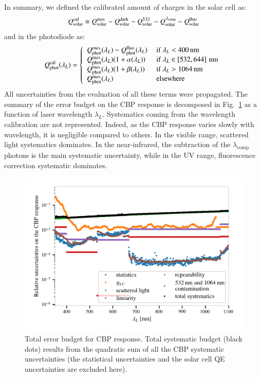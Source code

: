 In summary, we defined the calibrated amount of charges in the solar cell as:
\begin{equation}
Q_{\mathrm{solar}}^{\mathrm{cal}} \equiv Q_{\mathrm{solar}}^{\mathrm{mes}} - Q_{\mathrm{solar}}^{\rm dark} - Q_{\mathrm{solar}}^{532} - Q_{\mathrm{solar}}^{\lambda_{\rm comp}} - Q_{\mathrm{solar}}^{\rm fluo}
\end{equation}
and in the photodiode as:
\begin{equation}
\Qphotcal(\lambda_L) = \left\lbrace
\begin{array}{ll}
          \Qphotmes(\lambda_L) - \Qphot^{\mathrm{fluo}}(\lambda_L) &\ \text{if}\ \lambda_L < \SI{400}{\nano\meter} \\
         \Qphotmes(\lambda_L)(1 + \alpha(\lambda_L)) &\ \text{if}\ \lambda_L \in \left[532, 644\right]\mathrm{\,nm} \\
        \Qphotmes(\lambda_L)(1 + \beta(\lambda_L)) &\ \text{if}\ \lambda_L > \SI{1064}{\nano\meter} \\
        \Qphotmes(\lambda_L)&\ \text{elsewhere}
\end{array}\right. 
\end{equation}
All uncertainties from the evaluation of all these terms were propagated. The summary of the error budget on the CBP response is decomposed in Fig.~\ref{fig:cbp_budget} as a function of laser wavelength $\lambda_L$. Systematics coming from the wavelength calibration are not represented. Indeed, as the CBP response varies slowly with wavelength, it is negligible compared to others.  In the visible range, scattered light systematics dominates. In the near-infrared, the subtraction of the $\lambda_{\mathrm{comp}}$ photons is the main systematic uncertainty, while in the UV range, fluorescence correction systematic dominates.

\begin{figure}%
    \centering
    \includegraphics[width=\columnwidth]{fig/cbp_error_budget.png}
    \caption{Total error budget for CBP response. Total systematic budget (black dots) results from the quadratic sum of all the CBP systematic uncertainties (the statistical uncertainties and the solar cell QE uncertainties are excluded here).}
    \label{fig:cbp_budget}
\end{figure}


